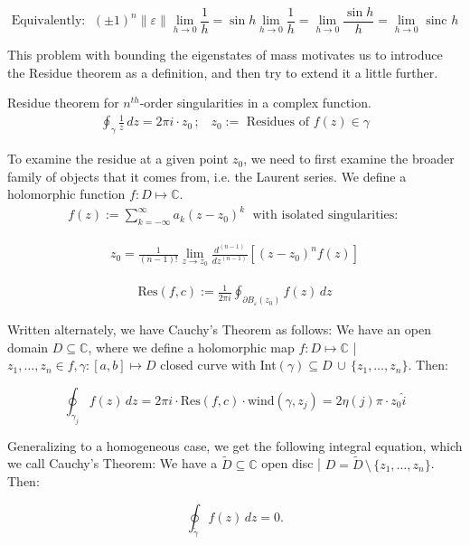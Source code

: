 \documentclass[12pt]{article}
\begin{document}
\[\text{Equivalently: }\; (\pm 1)^{n} \|\varepsilon\| \lim_{h\to0} \frac{1}{h} = \sin{h} \lim_{h\to0} \frac{1}{h} = \lim_{h\to0} \frac{\sin{h}}{h} = \lim_{h \to 0} \text{ sinc }{h}\]

This problem with bounding the eigenstates of mass motivates us to introduce the Residue theorem as a definition, and then try to extend it a little further. 

\begin{definition}
    Residue theorem for $n^{th}$-order singularities in a complex function.
    \begin{align} \oint_{\gamma} \frac{1}{z} \, dz = 2\pi i\cdot z_{0}\,; \;\;\;\text{$z_{0}:=$ Residues of $f(z)\in \gamma$}\end{align}

To examine the residue at a given point $z_{0}$, we need to first examine the broader family of objects that it comes from, i.e. the Laurent series. We define a holomorphic function $f: D \mapsto \mathbb{C}$. 
\begin{align}f(z) := \sum_{k=-\infty}^{\infty} a_{k} (z - z_{0})^{k} \;\text{ with isolated singularities: } \end{align}

\begin{align} z_{0} = \frac{1}{(n-1)!} \lim_{z\to z_{0}} \frac{d^{(n-1)}}{dz^{(n-1)}} [(z-z_{0})^{n}f(z)] \end{align}

\begin{align} \text{Res}(f,c) := \frac{1}{2\pi i} \oint_{\partial B_{\varepsilon}(z_{0})} f(z) \, dz \end{align}

Written alternately, we have Cauchy's Theorem as follows: We have an open domain $ D \subseteq \mathbb{C}$, where we define a holomorphic map $f: D \mapsto \mathbb{C}$ | $z_{1}, \dots, z_{n} \in f, \gamma:[a,b] \mapsto D$ closed curve with Int$(\gamma) \subseteq D \, \cup \, \{z_{1}, \dots, z_{n}\}$. Then: 

\[\oint_{\gamma_{j}} f(z) \, dz = 2\pi i \cdot \text{Res}(f,c) \cdot \text{wind}(\gamma, z_{j}) = 2 \eta(j) \pi \cdot z_{0} \hat i\]

Generalizing to a homogeneous case, we get the following integral equation, which we call Cauchy's Theorem: We have a $\tilde D \subseteq \mathbb{C}$ open disc | $D = \tilde D \, \setminus \, \{z_{1}, \dots, z_{n}\}$. Then: 

\[\oint_{\tilde{\gamma}} f(z)\, dz = 0. \]
\end{definition}
\end{document}
